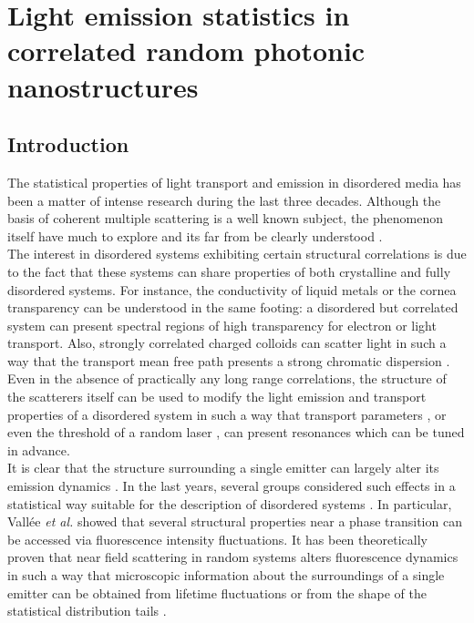 \chapter{Light emission statistics in correlated random photonic nanostructures\label{chap8}}

\section{Introduction}

The statistical properties of light transport and emission in disordered media has been a matter of intense research during the last three decades. Although the basis of coherent multiple scattering is a well known subject, the phenomenon itself have much to explore and its far from be clearly understood \cite{wiersma1997localization}. \\
The interest in disordered systems exhibiting certain structural correlations is due to the fact that these systems can share properties of both crystalline and fully disordered systems. For instance, the conductivity of liquid metals \cite{ashcroft1966structure} or the cornea transparency \cite{hart1969light} can be understood in the same footing: a disordered but correlated system can present spectral regions of high transparency for electron or light transport. Also, strongly correlated charged colloids can scatter light in such a way that the transport mean free path presents a strong chromatic dispersion \cite{Rojas_2004}. Even in the absence of practically any long range correlations, the structure of the scatterers itself can be used to modify the light emission and transport properties of a disordered system in such a way that transport parameters \cite{garcia2007photonic, sapienza2007observation}, or even the threshold of a random laser \cite{gottardo2008resonance}, can present resonances which can be tuned in advance. \\
It is clear that the structure surrounding a single emitter can largely alter its emission dynamics \cite{Purcell_1946,hernando2006effect,desousa2014ising}. In the last years, several groups considered such effects in a statistical way suitable for the description of disordered systems \cite{hernando2006effect,gersen2000influencing, vallee2006fluorescence,Froufe_PRA_2007,desousa2014ising}.  In particular, Vallée \textit{et al.} \cite{vallee2006fluorescence} showed that several structural properties near a phase transition can be accessed via fluorescence intensity fluctuations. It has been theoretically proven that near field scattering in random systems alters fluorescence dynamics in such a way that microscopic information about the surroundings of a single emitter can be obtained from lifetime fluctuations or from the shape of the statistical distribution tails \cite{Froufe_PRA_2007,Froufe_2008,caze2010near,Sapienza_2011}. 

